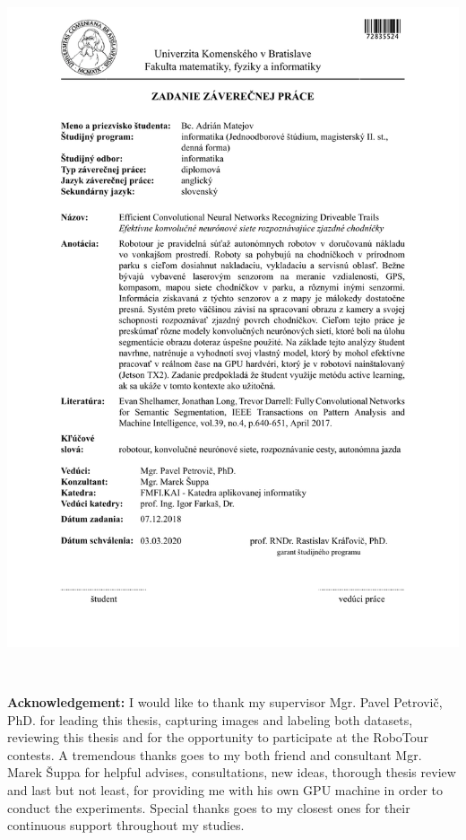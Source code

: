 \documentclass[12pt, oneside]{book}  %
\begin{document}
\hspace{-2cm}\includegraphics[width=1.1\textwidth]{assignments/zadanie_slovak}


\frontmatter

\setcounter{page}{3}
\newpage 
~

\vfill
{\bf Acknowledgement:} I would like to thank my supervisor Mgr. Pavel
Petrovič, PhD. for leading this thesis, capturing images and labeling both datasets,
reviewing this thesis and for the opportunity to participate at the RoboTour contests.
A tremendous thanks goes to my both friend and consultant Mgr. Marek Šuppa
for helpful advises, consultations, new ideas, thorough thesis review
and last but not least, for providing me with his own GPU machine in order to
conduct the experiments.
Special thanks goes to my closest ones for their continuous support throughout my studies.
\end{document}
